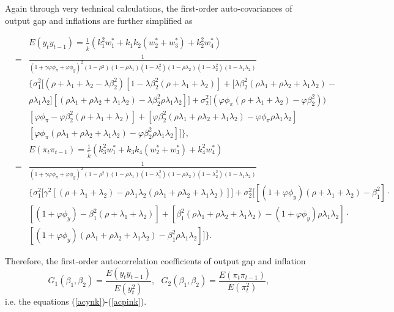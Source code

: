 \begin{appendix}
Again through very technical calculations, the first-order auto-covariances of output gap and inflations are further simplified as

 \begin{eqnarray}
&&E(y_ty_{t-1})=\frac{1}{\widetilde{k}}( k_1^2w_1^*+k_1k_2(w_2^*+w_3^*)+k_2^2w_4^*)\nonumber\\
&=&\frac{1}{(1+\gamma\varphi\phi_\pi+\varphi\phi_y)^2(1-\rho^2)(1-\rho\lambda_1)(1-\lambda_1^2)(1-\rho\lambda_2)(1-\lambda_2^2)(1-\lambda_1\lambda_2)}\nonumber\\
&&\Big\{\sigma_1^2\Big[(\rho+\lambda_1+\lambda_2-\lambda\beta_2^2)[1-\lambda\beta_2^2(\rho+\lambda_1+\lambda_2)]+[\lambda\beta_2^2(\rho\lambda_1+\rho\lambda_2+\lambda_1\lambda_2)-\nonumber\\
&&\rho\lambda_1\lambda_2][(\rho\lambda_1+\rho\lambda_2+\lambda_1\lambda_2)-\lambda\beta_2^2\rho\lambda_1\lambda_2]\Big]+\sigma_2^2\Big[(\varphi\phi_\pi(\rho+\lambda_1+\lambda_2)-\varphi\beta_2^2))\nonumber\\
&&[\varphi\phi_\pi-\varphi\beta_2^2(\rho+\lambda_1+\lambda_2)]+[\varphi\beta_2^2(\rho\lambda_1+\rho\lambda_2+\lambda_1\lambda_2)-\varphi\phi_\pi\rho\lambda_1\lambda_2]\nonumber\\
&&[\varphi\phi_\pi(\rho\lambda_1+\rho\lambda_2+\lambda_1\lambda_2)-\varphi\beta_2^2\rho\lambda_1\lambda_2]\Big]\Big\},\label{covy1app}\\
&&E(\pi_t\pi_{t-1})=\frac{1}{\widetilde{k}}( k_3^2w_1^*+k_3k_4(w_2^*+w_3^*)+k_4^2w_4^*)\nonumber\\
&=&\frac{1}{(1+\gamma\varphi\phi_\pi+\varphi\phi_y)^2(1-\rho^2)(1-\rho\lambda_1)(1-\lambda_1^2)(1-\rho\lambda_2)(1-\lambda_2^2)(1-\lambda_1\lambda_2)}\nonumber\\
&&\Big\{\sigma_1^2\Big[\gamma^2[(\rho+\lambda_1+\lambda_2)-\rho\lambda_1\lambda_2(\rho\lambda_1+\rho\lambda_2+\lambda_1\lambda_2)]\Big]+\sigma_2^2\Big[[(1+\varphi\phi_y)(\rho+\lambda_1+\lambda_2)-\beta_1^2]\cdot\nonumber\\
&&[(1+\varphi\phi_y)-\beta_1^2(\rho+\lambda_1+\lambda_2)]+[\beta_1^2(\rho\lambda_1+\rho\lambda_2+\lambda_1\lambda_2)-(1+\varphi\phi_y)\rho\lambda_1\lambda_2]\cdot\nonumber\\
&&[(1+\varphi\phi_y)(\rho\lambda_1+\rho\lambda_2+\lambda_1\lambda_2)-\beta_1^2\rho\lambda_1\lambda_2]\Big]\Big\}.\label{oovpi1app}
\end{eqnarray}



Therefore, the first-order autocorrelation coefficients of output gap and inflation
$$G_{1}(\beta_1,\beta_2)=\frac{E(y_ty_{t-1})}{E(y_t^2)},\,\,\,\,
G_{2}(\beta_1,\beta_2)=\frac{E(\pi_t\pi_{t-1})}{E(\pi_t^2)},$$
i.e. the equations (\ref{acynk})-(\ref{acpink}).


\end{appendix}
